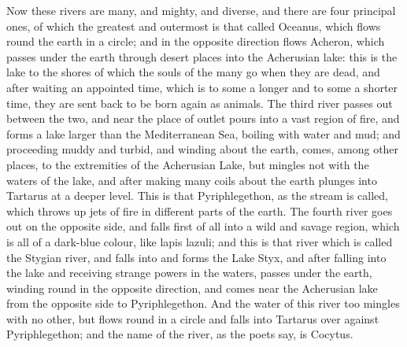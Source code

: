 Now these rivers are many, and mighty, and diverse, and there are four
principal ones, of which the greatest and outermost is that called
Oceanus, which flows round the earth in a circle; and in the opposite
direction flows Acheron, which passes under the earth through desert
places into the Acherusian lake: this is the lake to the shores of which
the souls of the many go when they are dead, and after waiting an
appointed time, which is to some a longer and to some a shorter time, they
are sent back to be born again as animals. The third river passes out
between the two, and near the place of outlet pours into a vast region of
fire, and forms a lake larger than the Mediterranean Sea, boiling with
water and mud; and proceeding muddy and turbid, and winding about the
earth, comes, among other places, to the extremities of the Acherusian
Lake, but mingles not with the waters of the lake, and after making many
coils about the earth plunges into Tartarus at a deeper level. This is
that Pyriphlegethon, as the stream is called, which throws up jets of fire
in different parts of the earth. The fourth river goes out on the opposite
side, and falls first of all into a wild and savage region, which is all
of a dark-blue colour, like lapis lazuli; and this is that river which is
called the Stygian river, and falls into and forms the Lake Styx, and
after falling into the lake and receiving strange powers in the waters,
passes under the earth, winding round in the opposite direction, and comes
near the Acherusian lake from the opposite side to Pyriphlegethon. And the
water of this river too mingles with no other, but flows round in a circle
and falls into Tartarus over against Pyriphlegethon; and the name of the
river, as the poets say, is Cocytus.

